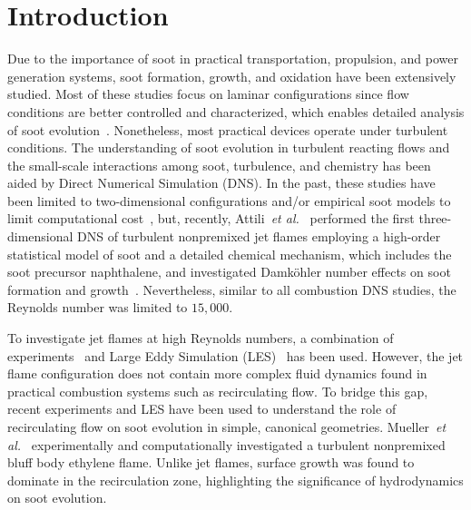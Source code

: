 \documentclass[review,3p,times]{elsarticle}
\begin{document}
\clearpage %

\section{Introduction}

Due to the importance of soot in practical transportation, propulsion, and power generation systems, soot formation, growth, and oxidation have been extensively studied.  Most of these studies focus on laminar configurations since flow conditions are better controlled and characterized, which enables detailed analysis of soot evolution~\cite{wang11}.  Nonetheless, most practical devices operate under turbulent conditions.  The understanding of soot evolution in turbulent reacting flows and the small-scale interactions among soot, turbulence, and chemistry has been aided by Direct Numerical Simulation (DNS).  In the past, these studies have been limited to two-dimensional configurations and/or empirical soot models to limit computational cost~\cite{yoo07,lignell07,lignell08,bisetti12}, but, recently, Attili~\emph{et al.}~\cite{attili14} performed the first three-dimensional DNS of turbulent nonpremixed jet flames employing a high-order statistical model of soot and a detailed chemical mechanism, which includes the soot precursor naphthalene, and investigated Damk\"{o}hler number effects on soot formation and growth~\cite{attili15}.  Nevertheless, similar to all combustion DNS studies, the Reynolds number was limited to $15,000$.

To investigate jet flames at high Reynolds numbers, a combination of experiments~\cite{qamar05,qamar09,lee09,zhang11} and Large Eddy Simulation (LES)~\cite{eiasrag09,mueller12,xuan15} has been used.  However, the jet flame configuration does not contain more complex fluid dynamics found in practical combustion systems such as recirculating flow.  To bridge this gap, recent experiments and LES have been used to understand the role of recirculating flow on soot evolution in simple, canonical geometries.  Mueller~\emph{et al.}~\cite{mueller13} experimentally and computationally investigated a turbulent nonpremixed bluff body ethylene flame.  Unlike jet flames, surface growth was found to dominate in the recirculation zone, highlighting the significance of hydrodynamics on soot evolution.
 
\end{document}
